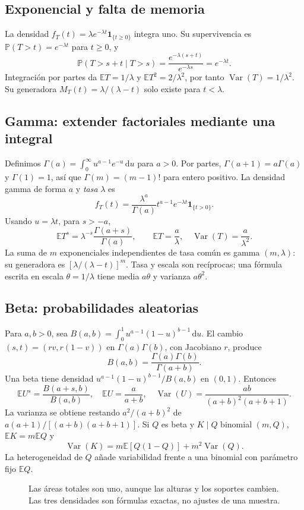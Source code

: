 \documentclass[11pt,a4paper]{article}
\newcommand{\E}{\mathbb E}
\newcommand{\Prob}{\mathbb P}
\newcommand{\ind}{\mathbf 1}
\newcommand{\dd}{\,\mathrm d}
\DeclareMathOperator{\Var}{Var}
\theoremstyle{definition}
\begin{document}
\subsection{Exponencial y falta de memoria}
La densidad $f_T(t)=\lambda e^{-\lambda t}\ind_{\{t\ge0\}}$ integra uno. Su supervivencia es $\Prob(T>t)=e^{-\lambda t}$ para $t\ge0$, y
\[
\Prob(T>s+t\mid T>s)=\frac{e^{-\lambda(s+t)}}{e^{-\lambda s}}=e^{-\lambda t}.
\]
Integración por partes da $\E T=1/\lambda$ y $\E T^2=2/\lambda^2$, por tanto $\Var(T)=1/\lambda^2$. Su generadora $M_T(t)=\lambda/(\lambda-t)$ solo existe para $t<\lambda$.
\subsection{Gamma: extender factoriales mediante una integral}
Definimos $\Gamma(a)=\int_0^\infty u^{a-1}e^{-u}\dd u$ para $a>0$. Por partes, $\Gamma(a+1)=a\Gamma(a)$ y $\Gamma(1)=1$, así que $\Gamma(m)=(m-1)!$ para entero positivo. La densidad gamma de forma $a$ y \emph{tasa} $\lambda$ es
\[
f_T(t)=\frac{\lambda^a}{\Gamma(a)}t^{a-1}e^{-\lambda t}\ind_{\{t>0\}}.
\]
Usando $u=\lambda t$, para $s>-a$,
\[
\E T^s=\lambda^{-s}\frac{\Gamma(a+s)}{\Gamma(a)},\qquad
\E T=\frac a\lambda,\quad\Var(T)=\frac a{\lambda^2}.
\]
La suma de $m$ exponenciales independientes de tasa común es gamma $(m,\lambda)$: su generadora es $[\lambda/(\lambda-t)]^m$. Tasa y escala son recíprocas; una fórmula escrita en escala $\theta=1/\lambda$ tiene media $a\theta$ y varianza $a\theta^2$.
\subsection{Beta: probabilidades aleatorias}
Para $a,b>0$, sea $B(a,b)=\int_0^1u^{a-1}(1-u)^{b-1}\dd u$. El cambio $(s,t)=(rv,r(1-v))$ en $\Gamma(a)\Gamma(b)$, con Jacobiano $r$, produce
\[
B(a,b)=\frac{\Gamma(a)\Gamma(b)}{\Gamma(a+b)}.
\]
Una beta tiene densidad $u^{a-1}(1-u)^{b-1}/B(a,b)$ en $(0,1)$. Entonces
\[
\E U^s=\frac{B(a+s,b)}{B(a,b)},\quad
\E U=\frac a{a+b},\quad
\Var(U)=\frac{ab}{(a+b)^2(a+b+1)}.
\]
La varianza se obtiene restando $a^2/(a+b)^2$ de $a(a+1)/[(a+b)(a+b+1)]$. Si $Q$ es beta y $K\mid Q$ binomial $(m,Q)$, $\E K=m\E Q$ y
\[
\Var(K)=m\E[Q(1-Q)]+m^2\Var(Q).
\]
La heterogeneidad de $Q$ añade variabilidad frente a una binomial con parámetro fijo $\E Q$.
\begin{figure}[H]\centering
{}
\caption{Las áreas totales son uno, aunque las alturas y los soportes cambien. Las tres densidades son fórmulas exactas, no ajustes de una muestra.}
\end{figure}
\end{document}
